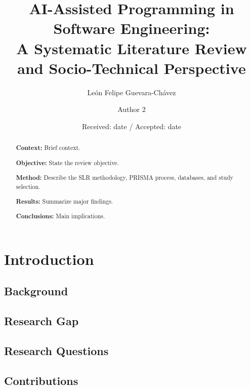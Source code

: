 \documentclass[smallextended]{svjour3}
\begin{document}
\title{AI-Assisted Programming in Software Engineering:\\
A Systematic Literature Review and Socio-Technical Perspective}


\author{León Felipe Guevara-Chávez \and Author 2}


\date{Received: date / Accepted: date}

\maketitle

\begin{abstract}
\textbf{Context:}
Brief context.

\textbf{Objective:}
State the review objective.

\textbf{Method:}
Describe the SLR methodology, PRISMA process, databases, and study selection.

\textbf{Results:}
Summarize major findings.

\textbf{Conclusions:}
Main implications.

\end{abstract}

\section{Introduction}

\subsection{Background}

\subsection{Research Gap}

\subsection{Research Questions}

\subsection{Contributions}
\end{document}
